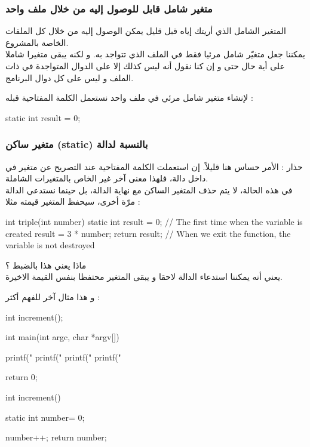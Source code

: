 \subsubsection{متغير شامل قابل للوصول إليه من خلال ملف واحد}

المتغير الشامل الذي أريتك إياه قبل قليل يمكن الوصول إليه من خلال كل الملفات الخاصة بالمشروع.\\
يمكننا جعل متغيّر شامل مرئيا فقط في الملف الذي تتواجد به. و لكنه يبقى متغيرا شاملا على أية حال حتى و إن كنا نقول أنه ليس كذلك إلا على الدوال المتواجدة في ذات الملف و ليس على كل دوال البرنامج.

لإنشاء متغير شامل مرئي في ملف واحد نستعمل الكلمة المفتاحية
قبله :

\begin{Csource}
static int result = 0;
\end{Csource}

\subsubsection{متغير ساكن (\textenglish{static}) بالنسبة لدالة}

حذار : الأمر حساس هنا قليلاً. إن استعملت الكلمة المفتاحية
عند التصريح عن متغير في داخل دالة، فلهذا معنى آخر غير الخاص بالمتغيرات الشاملة.\\
في هذه الحالة، لا يتم حذف المتغير الساكن مع نهاية الدالة، بل حينما نستدعي الدالة مرّة أخرى، سيحفظ المتغير قيمته مثلا :
\begin{Csource}
int triple(int number)
{
	static int result = 0; // The first time when the variable is created
	result = 3 * number;
	return result;
} // When we exit the function, the variable is not destroyed
\end{Csource}
ماذا يعني هذا بالضبط ؟\\
يعني أنه يمكننا استدعاء الدالة لاحقا و يبقى المتغير
محتفظا بنفس القيمة الاخيرة.

و هذا مثال آخر للفهم أكثر :
\begin{Csource}
int increment();

int main(int argc, char *argv[])
{
	printf("%
	printf("%
	printf("%
	printf("%

	return 0;
}

int increment()
{
	static int number= 0;

	number++;
	return number;
}
\end{Csource}

